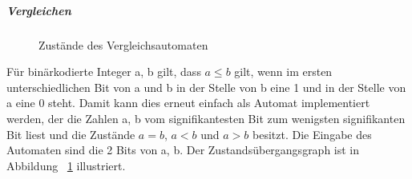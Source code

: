 \documentclass{article}
\begin{document}
\subparagraph{Vergleichen}\label{compare_automata}
\begin{figure}
\centering
\caption{Zust\"ande des Vergleichsautomaten}
\label{fig:compare_states}
\end{figure}
F\"ur bin\"arkodierte Integer a, b gilt, dass \(a \le b\) gilt,
wenn im ersten unterschiedlichen Bit von a und b in der Stelle von b eine 1 
und in der Stelle von a eine 0 steht. Damit kann dies erneut einfach als
Automat implementiert werden, der die Zahlen a, b vom signifikantesten
Bit zum wenigsten signifikanten Bit liest und die Zust\"ande 
\(a = b\), \(a < b\) und \(a > b\) besitzt. 
Die Eingabe des Automaten sind die 2 Bits von a, b. 
Der Zustands\"ubergangsgraph ist in Abbildung ~\ref{fig:compare_states}
illustriert. 
\end{document}
